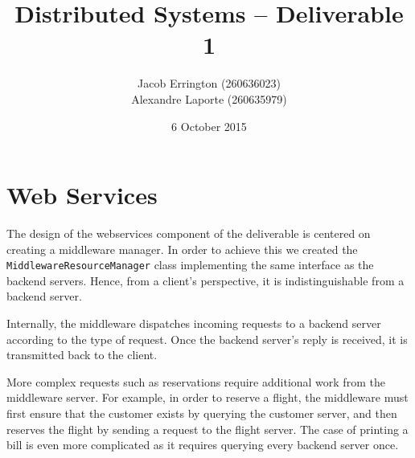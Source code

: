 \documentclass[letterpaper,11pt]{article}
\title{Distributed Systems -- Deliverable 1}
\author{Jacob Errington (260636023) \\ Alexandre Laporte (260635979)}
\date{6 October 2015}
\begin{document}
\maketitle

\section*{Web Services}

The design of the webservices component of the deliverable is centered on
creating a middleware manager. In order to achieve this we created
the \texttt{MiddlewareResourceManager} class implementing the same interface as
the backend servers. Hence, from a client's perspective, it is
indistinguishable from a backend server.

Internally, the middleware dispatches incoming requests to a backend server
according to the type of request. Once the backend server's reply is received,
it is transmitted back to the client.

More complex requests such as reservations require additional work from the
middleware server. For example, in order to reserve a flight, the middleware
must first ensure that the customer exists by querying the customer server,
and then reserves the flight by sending a request to the flight server. The
case of printing a bill is even more complicated as it requires querying every
backend server once.
\end{document}
